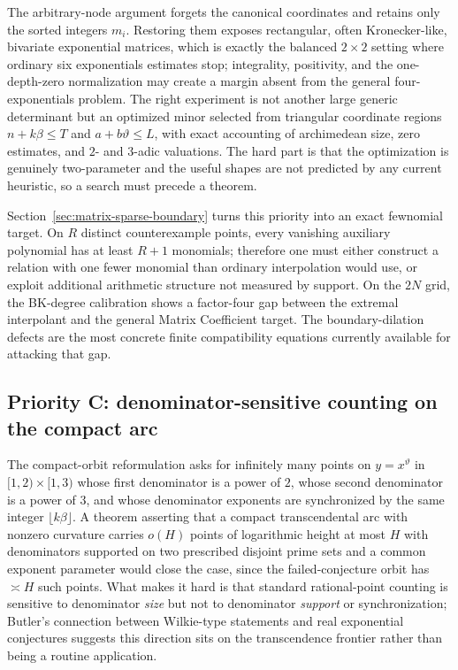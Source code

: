 \documentclass[11pt,oneside]{article}
\theoremstyle{definition}
\theoremstyle{remark}
\newcommand{\thetaq}{\vartheta}
\begin{document}
The arbitrary-node argument forgets the canonical coordinates and retains only the sorted
integers $m_i$.  Restoring them exposes rectangular, often Kronecker-like, bivariate
exponential matrices, which is exactly the balanced $2\times2$ setting where ordinary six
exponentials estimates stop; integrality, positivity, and the one-depth-zero normalization
may create a margin absent from the general four-exponentials problem.  The right experiment
is not another large generic determinant but an optimized minor selected from triangular
coordinate regions $n+k\beta\le T$ and $a+b\thetaq\le L$, with exact accounting of
archimedean size, zero estimates, and $2$- and $3$-adic valuations.  The hard part is that
the optimization is genuinely two-parameter and the useful shapes are not predicted by any
current heuristic, so a search must precede a theorem.

Section~\ref{sec:matrix-sparse-boundary} turns this priority into an exact
fewnomial target.  On $R$ distinct counterexample points, every vanishing auxiliary
polynomial has at least $R+1$ monomials; therefore one must either construct a relation with
one fewer monomial than ordinary interpolation would use, or exploit additional arithmetic
structure not measured by support.  On the $2N$ grid, the BK-degree calibration shows a
factor-four gap between the extremal interpolant and the general Matrix Coefficient target.
The boundary-dilation defects are the most concrete finite compatibility equations currently
available for attacking that gap.

\subsection{Priority C: denominator-sensitive counting on the compact arc}
\label{at:prog-counting}

The compact-orbit reformulation asks for infinitely many points on $y=x^{\thetaq}$ in
$[1,2)\times[1,3)$ whose first denominator is a power of $2$, whose second denominator is a
power of $3$, and whose denominator exponents are synchronized by the same integer
$\lfloor k\beta\rfloor$.  A theorem asserting that a compact transcendental arc with nonzero
curvature carries $o(H)$ points of logarithmic height at most $H$ with denominators
supported on two prescribed disjoint prime sets and a common exponent parameter would close
the case, since the failed-conjecture orbit has $\asymp H$ such points.  What makes it hard
is that standard rational-point counting is sensitive to denominator \emph{size} but not to
denominator \emph{support} or synchronization; Butler's connection between Wilkie-type
statements and real exponential conjectures \cite{Butler2017} suggests this direction sits
on the transcendence frontier rather than being a routine application.
\end{document}
